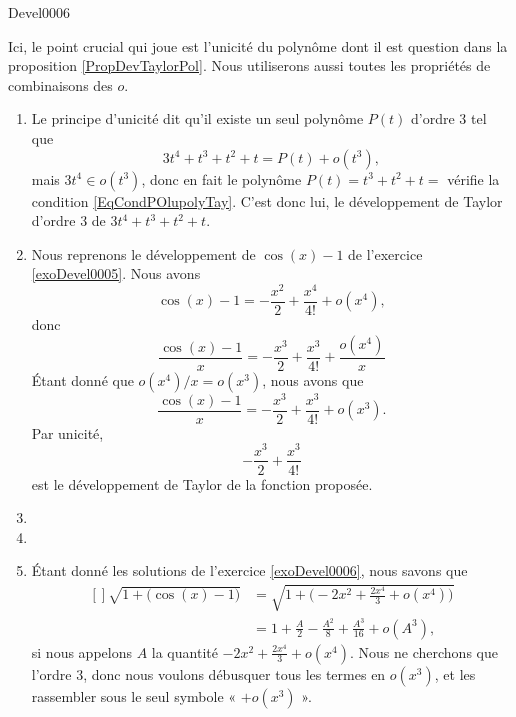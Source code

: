 
\begin{corrige}{Devel0006}

Ici, le point crucial qui joue est l'unicité du polynôme dont il est question dans la proposition \ref{PropDevTaylorPol}. Nous utiliserons aussi toutes les propriétés de combinaisons des $o$.
\begin{enumerate}

\item
Le principe d'unicité dit qu'il existe un seul polynôme $P(t)$ d'ordre $3$ tel que
\begin{equation}	\label{EqCondPOlupolyTay}
	3t^4+t^3+t^2+t=P(t)+o(t^3),
\end{equation}
	mais $3t^4\in o(t^3)$, donc en fait le polynôme $P(t)=t^3+t^2+t=$ vérifie la condition \eqref{EqCondPOlupolyTay}. C'est donc lui, le développement de Taylor d'ordre $3$ de $3t^4+t^3+t^2+t$.


\item
Nous reprenons le développement de $\cos(x)-1$ de l'exercice \ref{exoDevel0005}. Nous avons
\begin{equation}
	\cos(x)-1=-\frac{ x^2 }{ 2 }+\frac{ x^4 }{ 4! }+o(x^4),
\end{equation}
donc
\begin{equation}
	\frac{ \cos(x)-1}{x}=-\frac{ x^3 }{ 2 }+\frac{ x^3 }{ 4! }+\frac{ o(x^4)}{x}
\end{equation}
Étant donné que $o(x^4)/x=o(x^3)$, nous avons que
\begin{equation}
	\frac{ \cos(x)-1}{x}=-\frac{ x^3 }{ 2 }+\frac{ x^3 }{ 4! }+o(x^3).
\end{equation}
Par unicité,
\begin{equation}
	-\frac{ x^3 }{ 2 }+\frac{ x^3 }{ 4! }
\end{equation}
est le développement de Taylor de la fonction proposée.

\item
\item
\item
Étant donné les solutions de l'exercice \ref{exoDevel0006}, nous savons que
\begin{equation}
	\begin{aligned}[]
		\sqrt{1+\big( \cos(x)-1 \big)}
			&=\sqrt{1+\big( -2x^2+\frac{ 2x^4 }{ 3 }+o(x^4) \big)}\\
			&=1+\frac{ A }{2}-\frac{ A^2 }{ 8 }+\frac{ A^3 }{ 16 }+o(A^3),
	\end{aligned}
\end{equation}
si nous appelons $A$ la quantité $-2x^2+\frac{ 2x^4 }{ 3 }+o(x^4)$. Nous ne cherchons que l'ordre $3$, donc nous voulons débusquer tous les termes en $o(x^3)$, et les rassembler sous le seul symbole « $+o(x^3)$ ».


\end{enumerate}
\end{corrige}

